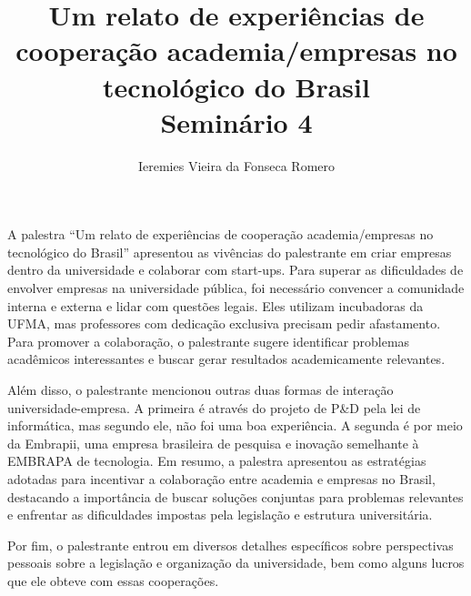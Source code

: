 \documentclass[11pt]{article}
\author{Ieremies Vieira da Fonseca Romero}
\date{}
\title{Um relato de experiências de cooperação academia/empresas no tecnológico do Brasil\\\medskip
\large Seminário 4}
\begin{document}
\maketitle
A palestra ``Um relato de experiências de cooperação academia/empresas no tecnológico do Brasil'' apresentou as vivências do palestrante em criar empresas dentro da universidade e colaborar com start-ups. Para superar as dificuldades de envolver empresas na universidade pública, foi necessário convencer a comunidade interna e externa e lidar com questões legais. Eles utilizam incubadoras da UFMA, mas professores com dedicação exclusiva precisam pedir afastamento. Para promover a colaboração, o palestrante sugere identificar problemas acadêmicos interessantes e buscar gerar resultados academicamente relevantes.

Além disso, o palestrante mencionou outras duas formas de interação universidade-empresa. A primeira é através do projeto de P\&D pela lei de informática, mas segundo ele, não foi uma boa experiência. A segunda é por meio da Embrapii, uma empresa brasileira de pesquisa e inovação semelhante à EMBRAPA de tecnologia. Em resumo, a palestra apresentou as estratégias adotadas para incentivar a colaboração entre academia e empresas no Brasil, destacando a importância de buscar soluções conjuntas para problemas relevantes e enfrentar as dificuldades impostas pela legislação e estrutura universitária.

Por fim, o palestrante entrou em diversos detalhes específicos sobre perspectivas pessoais sobre a legislação e organização da universidade, bem como alguns lucros que ele obteve com essas cooperações.
\end{document}
